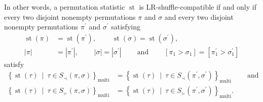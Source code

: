 \documentclass[numbers=enddot,12pt,final,onecolumn,notitlepage]{scrartcl}%
\theoremstyle{definition}
\begin{document}
In other words, a permutation statistic $\operatorname*{st}$ is
LR-shuffle-compatible if and only if every two disjoint nonempty permutations
$\pi$ and $\sigma$ and every two disjoint nonempty permutations $\pi^{\prime}$
and $\sigma^{\prime}$ satisfying%
\begin{align*}
\operatorname*{st}\left(  \pi\right)   &  =\operatorname*{st}\left(
\pi^{\prime}\right)  ,\ \ \ \ \ \ \ \ \ \ \operatorname*{st}\left(
\sigma\right)  =\operatorname*{st}\left(  \sigma^{\prime}\right)  ,\\
\left\vert \pi\right\vert  &  =\left\vert \pi^{\prime}\right\vert
,\ \ \ \ \ \ \ \ \ \ \left\vert \sigma\right\vert =\left\vert \sigma^{\prime
}\right\vert \ \ \ \ \ \ \ \ \ \ \text{and}\ \ \ \ \ \ \ \ \ \ \left[  \pi
_{1}>\sigma_{1}\right]  =\left[  \pi_{1}^{\prime}>\sigma_{1}^{\prime}\right]
\end{align*}
satisfy
\begin{align*}
\left\{  \operatorname*{st}\left(  \tau\right)  \ \mid\ \tau\in S_{\prec
}\left(  \pi,\sigma\right)  \right\}  _{\operatorname*{multi}}  &  =\left\{
\operatorname*{st}\left(  \tau\right)  \ \mid\ \tau\in S_{\prec}\left(
\pi^{\prime},\sigma^{\prime}\right)  \right\}  _{\operatorname*{multi}%
}\ \ \ \ \ \ \ \ \ \ \text{and}\\
\left\{  \operatorname*{st}\left(  \tau\right)  \ \mid\ \tau\in S_{\succ
}\left(  \pi,\sigma\right)  \right\}  _{\operatorname*{multi}}  &  =\left\{
\operatorname*{st}\left(  \tau\right)  \ \mid\ \tau\in S_{\succ}\left(
\pi^{\prime},\sigma^{\prime}\right)  \right\}  _{\operatorname*{multi}}.
\end{align*}
\end{document}
